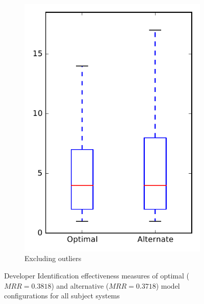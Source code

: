 \begin{figure}
\begin{subfigure}{.4\textwidth}
        \includegraphics[height=0.4\textheight]{figures/combo/dit_rq1_all_no_outlier}
        \caption{Excluding outliers}\label{fig:combo:dit:rq1:all_no_outlier}
    \end{subfigure}
\caption{Developer Identification effectiveness measures of optimal ($MRR=0.3818$) and alternative ($MRR=0.3718$) model configurations for all subject systems}
\label{fig:combo:dit:rq1:all}
\end{figure}

